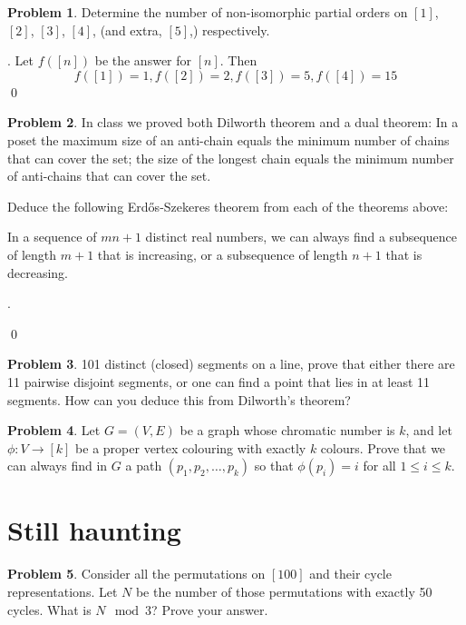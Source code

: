 \documentclass[12pt]{article}
\theoremstyle{definition}
\newtheorem{hw}{Problem}
\newenvironment{sol}
  {\par\vspace{3mm}\noindent{\it Solution}.}
  {\qed}
\begin{document}
\begin{hw}
Determine the number of non-isomorphic partial orders on $[1]$, $[2]$, $[3]$, $[4]$, (and extra, $[5]$,) respectively.
\end{hw}

\begin{sol}
	Let $f([n])$ be the answer for $[n]$. Then
	$$
	f([1]) = 1, f([2]) = 2, f([3]) = 5, f([4]) = 15
	$$
\end{sol}

\begin{hw}
In class we proved both Dilworth theorem and a dual theorem: In a poset the maximum size of an anti-chain equals the minimum
number of chains that can cover the set; the size of the longest chain equals the minimum number of anti-chains that can cover the set.

Deduce the following Erd\H{o}s-Szekeres theorem from each of the theorems above:

In a sequence of $mn+1$ distinct real numbers, we can always find a subsequence of length $m+1$ that is increasing, or
 a subsequence of length $n+1$ that is decreasing.
\end{hw}

\begin{sol}
	
\end{sol}

\begin{hw} 101 distinct (closed) segments on a line, prove that either there are 11 pairwise disjoint segments, or one can find a point that lies in at least 11 segments. How can you deduce this from Dilworth's theorem?
\end{hw}

\begin{hw}
Let $G=(V, E)$ be a graph whose chromatic number is $k$,
and let $\phi: V \to [k]$ be a proper vertex colouring with exactly
$k$ colours. Prove that we can always find in $G$ a path
$(p_1, p_2, \dots, p_k)$ so that $\phi(p_i) = i$ for all $1 \leq i \leq k$.
\end{hw}

\section{Still haunting}

\begin{hw}
Consider all the permutations on $[100]$ and their cycle
representations.
Let $N$ be the number of those permutations with
exactly 50 cycles. What is $N \mod 3$? Prove your answer.
\end{hw}
\end{document}
